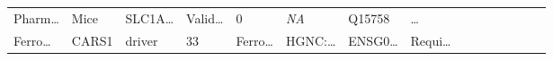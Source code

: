 \documentclass[
]{article}
\begin{document}
\begin{longtable}[]{@{}lllllllllllllll@{}}
\begin{minipage}[t]{0.05\columnwidth}
Pharm\ldots{}\strut
\end{minipage} & \begin{minipage}[t]{0.05\columnwidth}\raggedright
Mice\strut
\end{minipage} & \begin{minipage}[t]{0.05\columnwidth}\raggedright
SLC1A\ldots{}\strut
\end{minipage} & \begin{minipage}[t]{0.05\columnwidth}\raggedright
Valid\ldots{}\strut
\end{minipage} & \begin{minipage}[t]{0.05\columnwidth}\raggedright
0\strut
\end{minipage} & \begin{minipage}[t]{0.05\columnwidth}\raggedright
\emph{NA}\strut
\end{minipage} & \begin{minipage}[t]{0.05\columnwidth}\raggedright
Q15758\strut
\end{minipage} & \begin{minipage}[t]{0.02\columnwidth}\raggedright
\ldots{}\strut
\end{minipage}\tabularnewline
\begin{minipage}[t]{0.05\columnwidth}\raggedright
Ferro\ldots{}\strut
\end{minipage} & \begin{minipage}[t]{0.05\columnwidth}\raggedright
CARS1\strut
\end{minipage} & \begin{minipage}[t]{0.04\columnwidth}\raggedright
driver\strut
\end{minipage} & \begin{minipage}[t]{0.02\columnwidth}\raggedright
33\strut
\end{minipage} & \begin{minipage}[t]{0.05\columnwidth}\raggedright
Ferro\ldots{}\strut
\end{minipage} & \begin{minipage}[t]{0.05\columnwidth}\raggedright
HGNC:\ldots{}\strut
\end{minipage} & \begin{minipage}[t]{0.05\columnwidth}\raggedright
ENSG0\ldots{}\strut
\end{minipage} & \begin{minipage}[t]{0.05\columnwidth}\raggedright
Requi\ldots{}\strut
\end{minipage} & \begin{minipage}[t]{0.05\columnwidth}\raggedright

\end{minipage}
\end{longtable}
\end{document}
